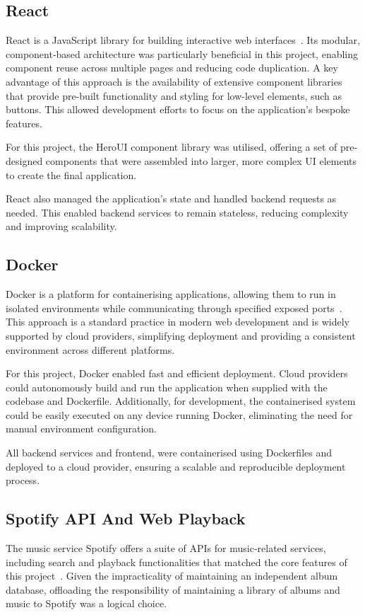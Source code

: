 \subsection{React}
React is a JavaScript library for building interactive web interfaces~\cite{React}. Its modular, component-based architecture was particularly beneficial in this project, enabling component reuse across multiple pages and reducing code duplication. A key advantage of this approach is the availability of extensive component libraries that provide pre-built functionality and styling for low-level elements, such as buttons. This allowed development efforts to focus on the application's bespoke features.

For this project, the HeroUI component library was utilised, offering a set of pre-designed components that were assembled into larger, more complex UI elements to create the final application.

React also managed the application's state and handled backend requests as needed. This enabled backend services to remain stateless, reducing complexity and improving scalability.

\subsection{Docker}
Docker is a platform for containerising applications, allowing them to run in isolated environments while communicating through specified exposed ports~\cite{DockerDocs}. This approach is a standard practice in modern web development and is widely supported by cloud providers, simplifying deployment and providing a consistent environment across different platforms.

For this project, Docker enabled fast and efficient deployment. Cloud providers could autonomously build and run the application when supplied with the codebase and Dockerfile. Additionally, for development, the containerised system could be easily executed on any device running Docker, eliminating the need for manual environment configuration.

All backend services and frontend, were containerised using Dockerfiles and deployed to a cloud provider, ensuring a scalable and reproducible deployment process.

\subsection{Spotify API And Web Playback}
The music service Spotify offers a suite of APIs for music-related services, including search and playback functionalities that matched the core features of this project~\cite{SpotifyAPI}. Given the impracticality of maintaining an independent album database, offloading the responsibility of maintaining a library of albums and music to Spotify was a logical choice.

